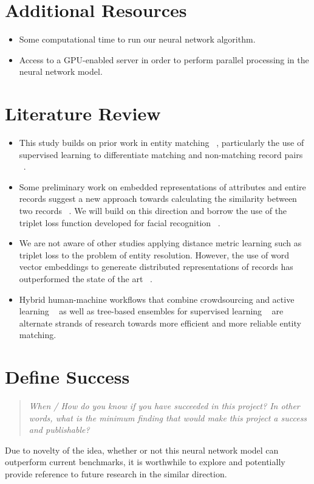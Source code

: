\documentclass{proc}
\begin{document}
\section{Additional Resources}

\begin{itemize}
  \item Some computational time to run our neural network algorithm.
  \item Access to a GPU-enabled server in order to perform parallel processing in the neural network model. 
\end{itemize}
 
\section{Literature Review}

\begin{itemize}
\item This study builds on prior work in entity matching ~\cite{elmagarmid2007duplicate}, particularly the use of supervised learning to differentiate matching and non-matching record pairs ~\cite{kopcke2010evaluation}.

\item Some preliminary work on embedded representations of attributes and entire records suggest a new approach towards calculating the similarity between two records ~\cite{ebraheem2017deeper}. We will build on this direction and borrow the use of the triplet loss function developed for facial recognition ~\cite{schroff2015facenet}.

\item We are not aware of other studies applying distance metric learning such as triplet loss to the problem of entity resolution. However, the use of word vector embeddings to genereate distributed representations of records has outperformed the state of the art ~\cite{ebraheem2017deeper}.

\item Hybrid human-machine workflows that combine crowdsourcing and active learning ~\cite{wang2012crowder,gokhale2014corleone} as well as tree-based ensembles for supervised learning ~\cite{varma2017relic} are alternate strands of research towards more efficient and more reliable entity matching.

\end{itemize}


\section{Define Success}
\begin{quote}
\emph{When / How do you know if you have succeeded in this project?
In other words, what is the minimum finding that would make this project a success and publishable?}
\end{quote}

Due to novelty of the idea, whether or not this neural network model can outperform current benchmarks, it is worthwhile to explore and potentially provide reference to future research in the similar direction.



\end{document}
